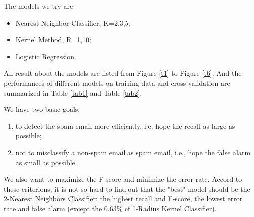 \documentclass[letterpaper, 12pt]{article}
\begin{document}
The models we try are
\begin{itemize}
\item Nearest Neighbor Classifier, K=2,3,5;
\item Kernel Method, R=1,10;
\item Logistic Regression.
\end{itemize}

All result about the models are listed from Figure \ref{t1} to Figure \ref{t6}. And the performances of different models on training data and cross-validation are summarized in Table \ref{tab1} and Table \ref{tab2}.

We have two basic goals:
\begin{enumerate}
\item to detect the spam email more efficiently, i.e. hope the recall as large as possible;
\item not to misclassify a non-spam email as spam email, i.e., hope the false alarm as small as possible.
\end{enumerate}
We also want to maximize the F score and minimize the error rate. Accord to these criterions, it is not so hard to find out that the "best" model should be the 2-Nearest Neighbors Classifier: the highest recall and F-score, the lowest error rate and false alarm (except the 0.63\% of 1-Radius Kernel Classifier).
\end{document}

